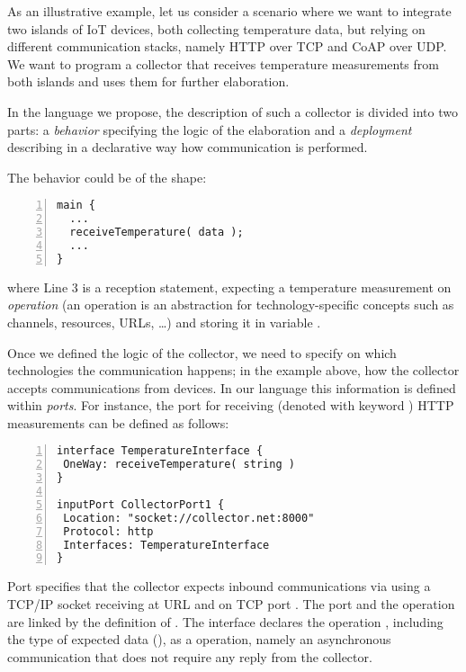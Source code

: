 As an illustrative example, let us consider a scenario where we want to
integrate two islands of IoT devices, both collecting temperature data, but
relying on different communication stacks, namely HTTP over TCP and CoAP over
UDP.
%
We want to program a collector that receives temperature measurements from both
islands and uses them for further elaboration.

In the language we propose, the description of such a collector is divided into
two parts: a \emph{behavior} specifying the logic of the elaboration and a
\emph{deployment} describing in a declarative way how communication is
performed.

The behavior could be of the shape:
%
\begin{lstlisting}[numbers=left,basicstyle=\footnotesize\ttfamily]
main {
  ...
  receiveTemperature( data );
  ...
}
\end{lstlisting}
%
where Line 3 is a reception statement, expecting a temperature measurement on
\emph{operation}  (an operation is an abstraction
for
technology-specific concepts such as channels, resources, URLs, \dots) and
storing it in variable .

Once we defined the logic of the collector, we need to specify on which
technologies the communication happens; in the example above, how the collector
accepts communications from devices. In our language this information is defined
within \emph{ports}. For instance, the port for receiving (denoted with keyword
) HTTP measurements can be defined as follows:
%
\begin{lstlisting}[numbers=left,basicstyle=\ttfamily\footnotesize]
interface TemperatureInterface {
 OneWay: receiveTemperature( string )
}

inputPort CollectorPort1 {
 Location: "socket://collector.net:8000"
 Protocol: http
 Interfaces: TemperatureInterface
}
\end{lstlisting}

Port  specifies that the collector expects inbound
communications via   using a TCP/IP socket receiving
at URL  and on TCP port . The port and the
operation are linked by the definition of  
. The interface declares
the operation , including the type of expected
data (), as a  operation, namely an
asynchronous communication that does not require any reply from the collector.

